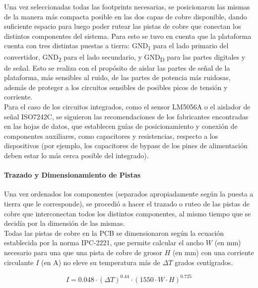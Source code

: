 Una vez seleccionadas todas las footprints necesarias, se posicionaron las mismas de la manera más compacta posible en las dos capas de cobre disponible, dando suficiente espacio para luego poder rutear las pistas de cobre que conectan los distintos componentes del sistema. Para esto se tuvo en cuenta que la plataforma cuenta con tres distintas puestas a tierra: GND\textsubscript{1} para el lado primario del convertidor, GND\textsubscript{2} para el lado secundario, y GND\textsubscript{D} para las partes digitales y de señal. Esto se realiza con el propósito de aislar las partes de señal de la plataforma, más sensibles al ruido, de las partes de potencia más ruidosas, además de proteger a los circuitos sensibles de posibles picos de tensión y corriente.\\

Para el caso de los circuitos integrados, como el sensor LM5056A o el aislador de señal ISO7242C, se siguieron las recomendaciones de los fabricantes encontradas en las hojas de datos, que establecen guías de posicionamiento y conexión de componentes auxiliares, como capacitores y resistencias, respecto a los dispositivos (por ejemplo, los capacitores de bypass de los pines de alimentación deben estar lo más cerca posible del integrado).\\

\paragraph{Trazado y Dimensionamiento de Pistas}

Una vez ordenados los componentes (separados apropiadamente según la puesta a tierra que le corresponde), se procedió a hacer el trazado o ruteo de las pistas de cobre que interconectan todos los distintos componentes, al mismo tiempo que se decidía por la dimensión de las mismas.\\

Todas las pistas de cobre en la PCB se dimensionaron según la ecuación establecida por la norma IPC-2221, que permite calcular el ancho $W$ (en \unit{\milli\metre}) necesario para una que una pista de cobre de grosor $H$ (en \unit{\milli\metre}) con una corriente circulante $I$ (en \unit{\ampere}) no eleve su temperatura más de $\Delta T$ grados centígrados.

\begin{equation}\label{eq:IPC2221}
    I = \num{0.048}\cdot (\Delta T)^{\num{0.44}}\cdot (\num{1550}\cdot W\cdot H)^{\num{0.725}}
\end{equation}

